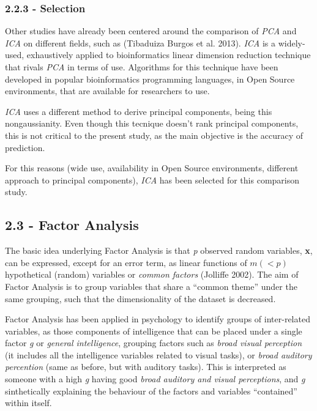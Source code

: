 \documentclass[]{article}
\begin{document}
\subsubsection{2.2.3 - Selection}\label{selection}

Other studies have already been centered around the comparison of
\emph{PCA} and \emph{ICA} on different fields, such as ({Tibaduiza
Burgos} et al. 2013). \emph{ICA} is a widely-used, exhaustively applied
to bioinformatics linear dimension reduction technique that rivals
\emph{PCA} in terms of use. Algorithms for this technique have been
developed in popular bioinformatics programming languages, in Open
Source environments, that are available for researchers to use.

\emph{ICA} uses a different method to derive principal components, being
this nongaussianity. Even though this tecnique doesn't rank principal
components, this is not critical to the present study, as the main
objective is the accuracy of prediction.

For this reasons (wide use, availability in Open Source environments,
different approach to principal components), \emph{ICA} has been
selected for this comparison study.

\subsection{2.3 - Factor Analysis}\label{factor-analysis}

The basic idea underlying Factor Analysis is that \emph{p} observed
random variables, \textbf{x}, can be expressed, except for an error
term, as linear functions of \(m(<p)\) hypothetical (random) variables
or \emph{common factors} (Jolliffe 2002). The aim of Factor Analysis is
to group variables that share a ``common theme'' under the same
grouping, such that the dimensionality of the dataset is decreased.

Factor Analysis has been applied in psychology to identify groups of
inter-related variables, as those components of intelligence that can be
placed under a single factor \emph{g} or \emph{general intelligence},
grouping factors such as \emph{broad visual perception} (it includes all
the intelligence variables related to visual tasks), or \emph{broad
auditory percention} (same as before, but with auditory tasks). This is
interpreted as someone with a high \emph{g} having good \emph{broad
auditory and visual perceptions}, and \emph{g} sinthetically explaining
the behaviour of the factors and variables ``contained'' within itself.
\end{document}
